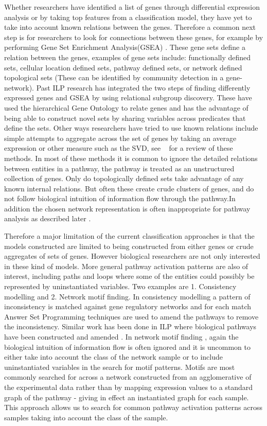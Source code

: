 \documentclass[runningheads,a4paper]{llncs}
\begin{document}
Whether researchers have identified a list of genes through differential expression analysis or by taking top features from a classification model, they have yet to take into account known relations between the genes. Therefore  a common next step is for researchers to look for connections between these genes, for example by performing Gene Set Enrichment Analysis(GSEA) \citep{subramanian_gene_2005}. These gene sets define a relation between the genes,  examples of gene sets include: functionally defined sets, cellular location defined sets, pathway defined sets, or network defined topological sets (These can be identified by community detection in a gene-network).
Past ILP research \citep{gamberger_induction_2004} has integrated the two steps of finding differently expressed genes and GSEA by using relational subgroup discovery. These have used the hierarchical Gene Ontology to relate genes and has the advantage of being able to construct novel sets by sharing variables across predicates that define the sets. Other ways researchers have tried to use known relations include simple attempts to aggregate across the set of genes by taking an average expression or other measure such as the SVD, see ~\citep{holec_comparative_2012} for a review of these methods.  In most of these methods it is common to ignore the detailed relations between entities in a pathway, the pathway is treated as an unstructured collection of genes. Only do topologically defined sets take advantage of any known internal relations. But often these create crude clusters of genes, and do not follow biological intuition of information flow through the pathway.In addition the chosen network representation is often inappropriate for pathway analysis as described later .

Therefore a major limitation of the current classification approaches is that the models constructed are limited to being constructed from either genes or crude aggregates of sets of genes. However biological researchers are not only interested in these kind of models. More general pathway activation patterns are also of interest, including paths and loops where some of the entities could possibly be represented by uninstantiated variables. Two examples are 1. Consistency modelling and 2. Network motif finding. In consistency modelling \citep{guziolowski2010analysis} a pattern of inconsistency is matched against gene regulatory networks and for each match Answer Set Programming techniques are used to amend the pathways to remove the inconsistency. Similar work has been done in ILP  where biological pathways have been constructed and amended \citep{ray2010automatic}. In network motif finding \citep{kim_biological_2011}, again the biological intuition of information flow is often ignored and it is uncommon to either take into account the class of the network sample or to include uninstantiated variables in the search for motif patterns. Motifs are most commonly searched for across a network constructed from an agglomerative of the experimental data rather than by mapping expression values to a standard graph of the pathway - giving in effect an instantiated graph for each sample. This approach allows us to search for common pathway activation patterns across samples taking into account the class of the sample. 
\end{document}
